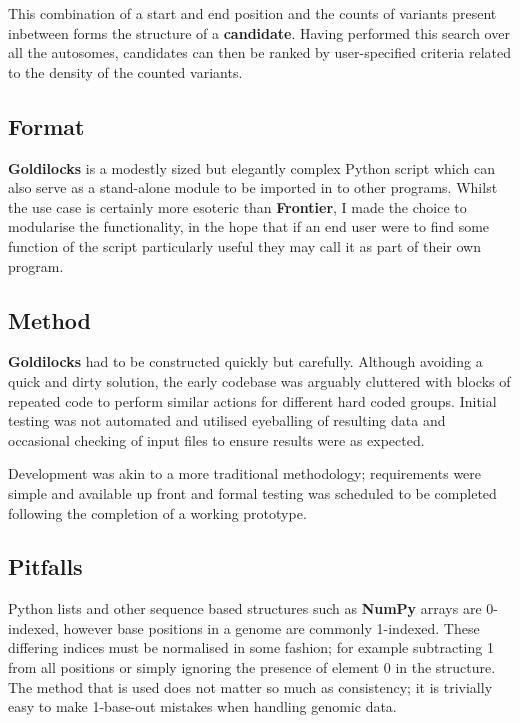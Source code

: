 This combination of a start and end position and the counts of variants present
inbetween forms the structure of a \textbf{candidate}. Having performed this
search over all the autosomes, candidates can then be ranked by user-specified
criteria related to the density of the counted variants.


\subsection{Format}

\textbf{Goldilocks} is a modestly sized but elegantly complex Python script
which can also serve as a stand-alone module to be imported in to other
programs. Whilst the use case is certainly more esoteric than \textbf{Frontier},
I made the choice to modularise the functionality, in the hope that if an end
user were to find some function of the script particularly useful they may call
it as part of their own program.


\subsection{Method}

\textbf{Goldilocks} had to be constructed quickly but carefully. Although
avoiding a quick and dirty solution, the early codebase was arguably cluttered
with blocks of repeated code to perform similar actions for different hard coded
groups. Initial testing was not automated and utilised eyeballing of resulting
data and occasional checking of input files to ensure results were as expected.

Development was akin to a more traditional methodology; requirements were simple
and available up front and formal testing was scheduled to be completed
following the completion of a working prototype.


\subsection{Pitfalls}

Python lists and other sequence based structures such as \textbf{NumPy} arrays
are 0-indexed, however base positions in a genome are commonly 1-indexed. These
differing indices must be normalised in some fashion; for example subtracting 1
from all positions or simply ignoring the presence of element 0 in
the structure. The method that is used does not matter so much as consistency;
it is trivially easy to make 1-base-out mistakes when handling genomic data.

